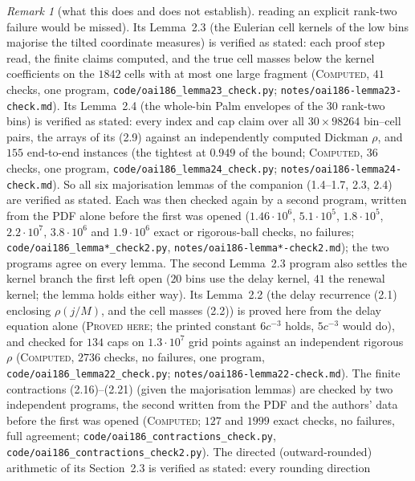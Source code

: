 \documentclass[11pt]{amsart}
\theoremstyle{definition}
\theoremstyle{remark}
\newtheorem{remark}[theorem]{Remark}
\newcommand{\lbl}[1]{\textup{\textsc{#1}}}
\begin{document}
\begin{remark}[what this does and does not establish]
reading an explicit rank-two failure would be missed). Its Lemma~2.3 (the Eulerian cell kernels of the
low bins majorise the tilted coordinate measures) is verified as stated: each proof step read, the finite claims
computed, and the true cell masses below the kernel coefficients on the $1842$ cells with at most one large fragment
(\lbl{Computed}, $41$ checks, one program, \texttt{code/}\allowbreak\texttt{oai186\_lemma23\_check.py};
\texttt{notes/}\allowbreak\texttt{oai186-lemma23-check.md}). Its Lemma~2.4 (the whole-bin Palm envelopes of the $30$
rank-two bins) is verified as stated: every index and cap claim over all $30\times98264$ bin--cell pairs, the
arrays of its (2.9) against an independently computed Dickman $\rho$, and $155$ end-to-end instances (the tightest at
$0.949$ of the bound; \lbl{Computed}, $36$ checks, one program, \texttt{code/}\allowbreak\texttt{oai186\_lemma24\_check.py};
\texttt{notes/}\allowbreak\texttt{oai186-lemma24-check.md}). So all six majorisation lemmas of the companion
(1.4--1.7, 2.3, 2.4) are verified as stated. Each was then checked again by a second program, written from the PDF
alone before the first was opened ($1.46\cdot10^6$, $5.1\cdot10^5$, $1.8\cdot10^5$, $2.2\cdot10^7$, $3.8\cdot10^6$ and
$1.9\cdot10^6$ exact or rigorous-ball checks, no failures; \texttt{code/}\allowbreak\texttt{oai186\_lemma*\_check2.py},
\texttt{notes/}\allowbreak\texttt{oai186-lemma*-check2.md}); the two programs agree on every lemma. The second Lemma~2.3
program also settles the kernel branch the first left open ($20$ bins use the delay kernel, $41$ the renewal kernel; the
lemma holds either way). Its Lemma~2.2 (the delay recurrence (2.1) enclosing $\rho(j/M)$, and the cell masses (2.2)) is
proved here from the delay equation alone (\lbl{Proved here}; the printed constant $6c^{-3}$ holds, $5c^{-3}$ would do), and
checked for $134$ caps on $1.3\cdot10^7$ grid points against an independent rigorous $\rho$ (\lbl{Computed}, $2736$ checks, no
failures, one program, \texttt{code/}\allowbreak\texttt{oai186\_lemma22\_check.py}; \texttt{notes/}\allowbreak\texttt{oai186-lemma22-check.md}).
The finite contractions (2.16)--(2.21) (given the majorisation lemmas) are checked by two independent programs, the second
written from the PDF and the authors' data before the first was opened (\lbl{Computed}; $127$ and $1999$ exact checks, no
failures, full agreement; \texttt{code/}\allowbreak\texttt{oai186\_contractions\_check.py},
\texttt{code/}\allowbreak\texttt{oai186\_contractions\_check2.py}).
The directed (outward-rounded) arithmetic of its Section~2.3 is verified as stated: every rounding direction

\end{remark}
\end{document}
